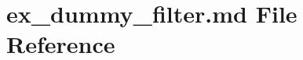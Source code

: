 \hypertarget{ex__dummy__filter_8md}{}\section{ex\+\_\+dummy\+\_\+filter.\+md File Reference}
\label{ex__dummy__filter_8md}
